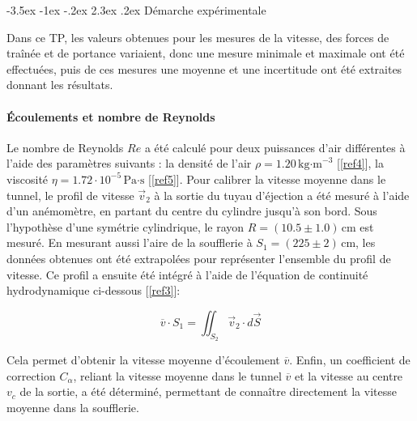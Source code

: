 \documentclass[a4paper, 12pt,oneside]{article}
\makeatletter
\renewcommand{\section}{\@startsection {section}{1}{\z@}%
             {-3.5ex \@plus -1ex \@minus -.2ex}%
             {2.3ex \@plus.2ex}%
             {\normalfont\normalsize\bfseries}}
\makeatother
\begin{document}
\section{Démarche expérimentale}
\vspace{-0.25cm}

Dans ce TP, les valeurs obtenues pour les mesures de la vitesse, des forces de traînée et de portance variaient, donc une mesure minimale et maximale ont été effectuées, puis de ces mesures une moyenne et une incertitude ont été extraites donnant les résultats.

\vspace{-0.3cm}
\paragraph{Écoulements et nombre de Reynolds}


Le nombre de Reynolds $Re$ a été calculé pour deux puissances d'air différentes à l’aide des paramètres suivants : la densité de l’air $\rho = 1.20 \, \text{kg·m}^{-3}$ [\ref{ref4}], la viscosité $\eta = 1.72 \cdot 10^{-5} \, \text{Pa·s}$ [\ref{ref5}]. Pour calibrer la vitesse moyenne dans le tunnel, le profil de vitesse $\vec{v}_2$ à la sortie du tuyau d’éjection a été mesuré à l’aide d’un anémomètre, en partant du centre du cylindre jusqu’à son bord. Sous l’hypothèse d’une symétrie cylindrique, le rayon $R=(10.5\pm1.0)$\,cm est mesuré. En mesurant aussi l'aire de la soufflerie à $S_1=(225\pm2)$\,cm, les données obtenues ont été extrapolées pour représenter l’ensemble du profil de vitesse. Ce profil a ensuite été intégré à l’aide de l’équation de continuité hydrodynamique ci-dessous [\ref{ref3}]:

\begin{equation}
\overline{v} \cdot S_1 = \iint_{S_2} \vec{v}_2 \cdot d\vec{S}
\label{eq5}
\end{equation}

Cela permet d'obtenir la vitesse moyenne d’écoulement $\overline{v}$. Enfin, un coefficient de correction $C_\alpha$, reliant la vitesse moyenne dans le tunnel $\overline{v}$ et la vitesse au centre $v_c$ de la sortie, a été déterminé, permettant de connaître directement la vitesse moyenne dans la soufflerie.


\vspace{-0.35cm}
\end{document}
